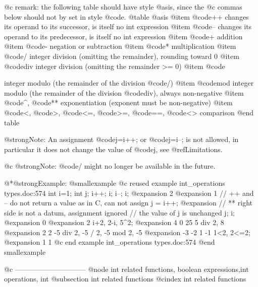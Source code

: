 {@c remark: the following table should have style @asis, since the
@c   commas below should not by set in style @code.
@table @asis
@item @code{++}
changes its operand to its successor, is itself no int expression
@item @code{--}
changes its operand to its predecessor, is itself no int expression
@item @code{+}
addition
@item @code{-}
negation or subtraction
@item @code{*}
multiplication
@item @code{/}
integer division (omitting the remainder), rounding toward 0
@item @code{div}
integer division (omitting the remainder >= 0)
@item @code{%
integer modulo (the remainder of the division @code{/})
@item @code{mod}
integer modulo (the remainder of the division @code{div}), always non-negative
@item @code{^}, @code{**}
exponentiation (exponent must be non-negative)
@item @code{<}, @code{>}, @code{<=}, @code{>=}, @code{==}, @code{<>}
comparison
@end table

@strong{Note:} An assignment @code{j=i++;} or @code{j=i--;} is not allowed,
in particular it does not change
the value of @code{j}, see @ref{Limitations}.

@c @strong{Note:} @code{/} might no longer be available in the future.

@*@strong{Example:}
@smallexample
@c reused example int_operations types.doc:574 
  int i=1;
  int j;
  i++; i;  i--; i;
@expansion{} 2
@expansion{} 1
  // ++ and -- do not return a value as in C, can not assign
  j = i++;
@expansion{} // ** right side is not a datum, assignment ignored
  // the value of j is unchanged
  j; i;
@expansion{} 0
@expansion{} 2
  i+2, 2-i, 5^2;
@expansion{} 4 0 25
  5 div 2, 8%
@expansion{} 2 2
  -5 div 2, -5 / 2, -5 mod 2, -5 %
@expansion{} -3 -2 1 -1
  1<2, 2<=2;
@expansion{} 1 1
@c end example int_operations types.doc:574
@end smallexample

@c ------------------------------
@node int related functions, boolean expressions,int operations, int
@subsection int related functions
@cindex int related functions

}}
